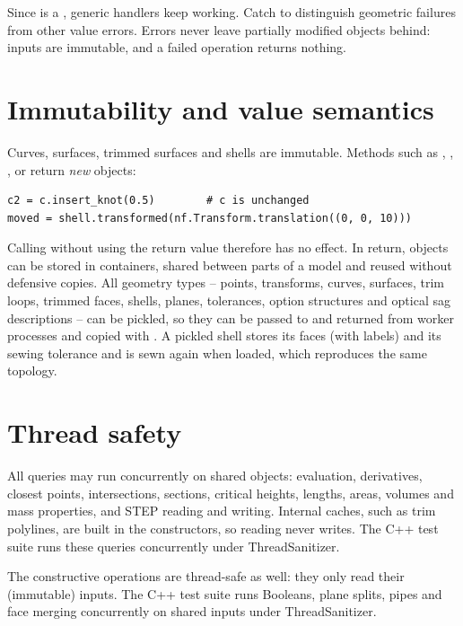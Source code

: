 Since  is a , generic handlers keep working. Catch
 to distinguish geometric failures from other value errors. Errors never
leave partially modified objects behind: inputs are immutable, and a failed operation returns
nothing.

\section{Immutability and value semantics}\label{sec:concepts-immutability}

Curves, surfaces, trimmed surfaces and shells are immutable. Methods such as
, , ,  or
 return \emph{new} objects:

\begin{lstlisting}
c2 = c.insert_knot(0.5)        # c is unchanged
moved = shell.transformed(nf.Transform.translation((0, 0, 10)))
\end{lstlisting}

Calling  without using the return value therefore has no effect. In
return, objects can be stored in containers, shared between parts of a model and reused without
defensive copies. All geometry types -- points, transforms, curves, surfaces, trim loops,
trimmed faces, shells, planes, tolerances, option structures and optical sag descriptions --
can be pickled, so they can be passed to and returned from worker processes and copied with
. A pickled shell stores its faces (with labels) and its sewing tolerance and
is sewn again when loaded, which reproduces the same topology.

\section{Thread safety}\label{sec:concepts-threads}

All  queries may run concurrently on shared objects: evaluation, derivatives, closest
points, intersections, sections, critical heights, lengths, areas, volumes and mass properties,
and STEP reading and writing. Internal caches, such as trim polylines, are built in the
constructors, so reading never writes. The C++ test suite runs these queries concurrently under
ThreadSanitizer.

The constructive operations are thread-safe as well: they only read their (immutable) inputs.
The C++ test suite runs Booleans, plane splits, pipes and face merging concurrently on shared
inputs under ThreadSanitizer.

